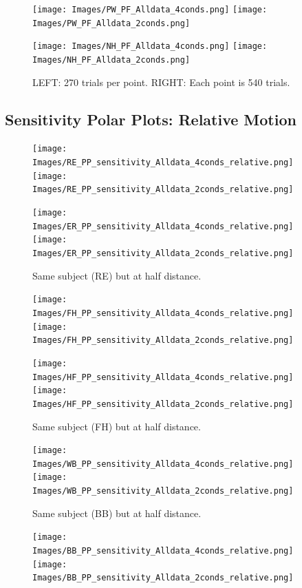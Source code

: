 \documentclass[11pt]{article} %
\begin{document}
\begin{figure}[H]
\centering %
\texttt{[image: Images/PW\_PF\_Alldata\_4conds.png]}
\texttt{[image: Images/PW\_PF\_Alldata\_2conds.png]}
\end{figure}
\begin{figure}[H]
\centering %
\texttt{[image: Images/NH\_PF\_Alldata\_4conds.png]}
\texttt{[image: Images/NH\_PF\_Alldata\_2conds.png]}
\caption{LEFT: 270 trials per point. RIGHT: Each point is 540 trials.}
\end{figure}

\newpage
\subsection{Sensitivity Polar Plots: Relative Motion}
\begin{figure}[H]
\centering %
\texttt{[image: Images/RE\_PP\_sensitivity\_Alldata\_4conds\_relative.png]}
\texttt{[image: Images/RE\_PP\_sensitivity\_Alldata\_2conds\_relative.png]}
\end{figure}
\begin{figure}[H]
\centering %
\texttt{[image: Images/ER\_PP\_sensitivity\_Alldata\_4conds\_relative.png]}
\texttt{[image: Images/ER\_PP\_sensitivity\_Alldata\_2conds\_relative.png]}
\caption{Same subject (RE) but at half distance.}
\end{figure}
\begin{figure}[H]
\centering %
\texttt{[image: Images/FH\_PP\_sensitivity\_Alldata\_4conds\_relative.png]}
\texttt{[image: Images/FH\_PP\_sensitivity\_Alldata\_2conds\_relative.png]}
\end{figure}
\begin{figure}[H]
\centering %
\texttt{[image: Images/HF\_PP\_sensitivity\_Alldata\_4conds\_relative.png]}
\texttt{[image: Images/HF\_PP\_sensitivity\_Alldata\_2conds\_relative.png]}
\caption{Same subject (FH) but at half distance.}
\end{figure}
\begin{figure}[H]
\centering %
\texttt{[image: Images/WB\_PP\_sensitivity\_Alldata\_4conds\_relative.png]}
\texttt{[image: Images/WB\_PP\_sensitivity\_Alldata\_2conds\_relative.png]}
\caption{Same subject (BB) but at half distance.}
\end{figure}
\begin{figure}[H]
\centering %
\texttt{[image: Images/BB\_PP\_sensitivity\_Alldata\_4conds\_relative.png]}
\texttt{[image: Images/BB\_PP\_sensitivity\_Alldata\_2conds\_relative.png]}
\end{figure}
\end{document}
